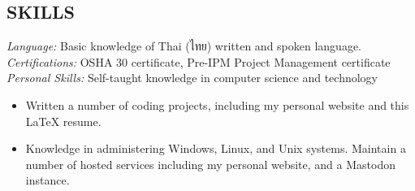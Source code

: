 \documentclass[margin]{res}
\begin{document}
\begin{resume}
\section{SKILLS}
    {\sl Language:} Basic knowledge of Thai (ไทย) written and spoken language. \\
    {\sl Certifications:} OSHA 30 certificate, Pre-IPM Project Management certificate
    {\sl Personal Skills:} Self-taught knowledge in computer science and technology
    \begin{itemize} \itemsep -2pt
    \item Written a number of coding projects, including my personal website and this \LaTeX{} resume. 
    \item Knowledge in administering Windows, Linux, and Unix systems. Maintain a number of hosted services including my personal website, and a Mastodon instance.
    \end{itemize}

\end{resume}
\end{document}
